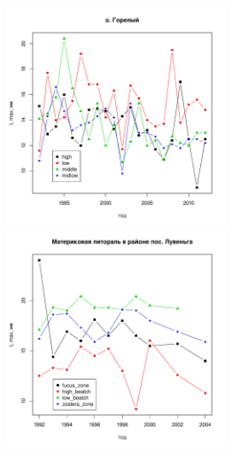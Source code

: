 \documentclass[12pt, a4paper]{article}
\begin{document}
\newpage
\begin{figure}[h]

\begin{minipage}[b]{.46\linewidth}
\begin{center}
\includegraphics[width=65mm]{../White_Sea/Luvenga_Goreliy/L_max.pdf}
\end{center}
\end{minipage}
%
\hfil %
%
\begin{minipage}[b]{.46\linewidth}
\begin{center}
\includegraphics[width=65mm]{../White_Sea//Luvenga_II_razrez/L_max.pdf}
\end{center}
\end{minipage}




\end{figure}
\end{document}
